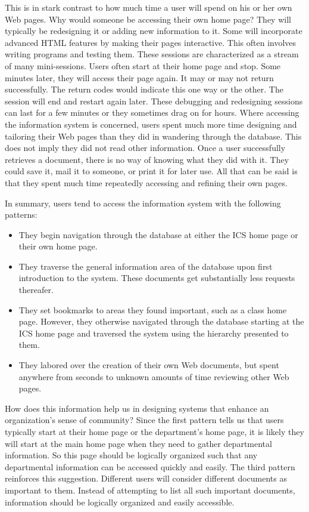 This is in stark contrast to how much time a user will spend on his or her own
Web pages.  Why would someone be accessing their own home page?  They will
typically be redesigning it or adding new information to it.  Some will
incorporate advanced HTML features by making their pages interactive.  This
often involves writing programs and testing them.  These sessions are
characterized as a stream of many mini-sessions.  Users often start at their
home page and stop.  Some minutes later, they will access their page again.  It
may or may not return successfully.  The return codes would indicate this one
way or the other.  The session will end and restart again later.  These
debugging and redesigning sessions can last for a few minutes or they sometimes
drag on for hours.  Where accessing the information system is concerned, users
spent much more time designing and tailoring their Web pages than they did in
wandering through the database.  This does not imply they did not read other
information.  Once a user successfully retrieves a document, there is no way of
knowing what they did with it.  They could save it, mail it to someone, or
print it for later use.  All that can be said is that they spent much time
repeatedly accessing and refining their own pages.

In summary, users tend to access the information system with the following
patterns:

\begin{itemize}
\item{They begin navigation through the database at either the ICS home page
  or their own home page.}
\item{They traverse the general information area of the database upon first
  introduction to the system.  These documents get substantially less
  requests thereafer.}
\item{They set bookmarks to areas they found important, such as a class home
  page.  However, they otherwise navigated through the database starting at
  the ICS home page and traversed the system using the hierarchy presented to
  them.}
\item{They labored over the creation of their own Web documents, but spent
  anywhere from seconds to unknown amounts of time reviewing other Web
  pages.}
\end{itemize}

How does this information help us in designing systems that enhance an
organization's sense of community?  Since the first pattern tells us that users
typically start at their home page or the department's home page, it is likely
they will start at the main home page when they need to gather departmental
information.  So this page should be logically organized such that any
departmental information can be accessed quickly and easily.  The third pattern
reinforces this suggestion.  Different users will consider different documents
as important to them.  Instead of attempting to list all such important
documents, information should be logically organized and easily accessible.


